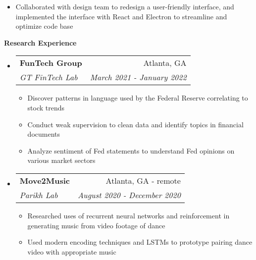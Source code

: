 \documentclass[letterpaper,10pt]{article}
\makeatletter
\newcommand{\resitem}[1]{\item #1 \vspace{-3.5pt}}
\newcommand{\resheading}[1]{{\large \colorbox{mygrey}{\begin{minipage}{\textwidth}{\textbf{#1 \vphantom{p\^{E}}}}\end{minipage}}}}
\newcommand{\ressubheading}[4]{
\begin{tabular*}{7.0in}{l@{\extracolsep{\fill}}r}
		\textbf{#1} & #2 \\
		\textit{#3} & \textit{#4} \\
\end{tabular*}\vspace{-6pt}}
\makeatother
\begin{document}
\begin{itemize}
\begin{itemize}
        \resitem{Collaborated with design team to redesign a user-friendly interface, and implemented the interface with React and Electron to streamline and optimize code base}
    \end{itemize}
\end{itemize}


\resheading{Research Experience}
\begin{itemize}
\item
    \ressubheading{FunTech Group}{Atlanta, GA}{GT FinTech Lab}{March 2021 - January 2022}
    \begin{itemize}
        \resitem{Discover patterns in language used by the Federal Reserve correlating to stock trends}
        \resitem{Conduct weak supervision to clean data and identify topics in financial documents}
        \resitem{Analyze sentiment of Fed statements to understand Fed opinions on various market sectors}
    \end{itemize}
\item
    \ressubheading{Move2Music}{Atlanta, GA - remote}{Parikh Lab}{August 2020 - December 2020}
    \begin{itemize}
        \resitem{Researched uses of recurrent neural networks and reinforcement in generating music from video footage of dance}
        \resitem{Used modern encoding techniques and LSTMs to prototype pairing dance video with appropriate music}
    \end{itemize}
\end{itemize}

\end{document}
